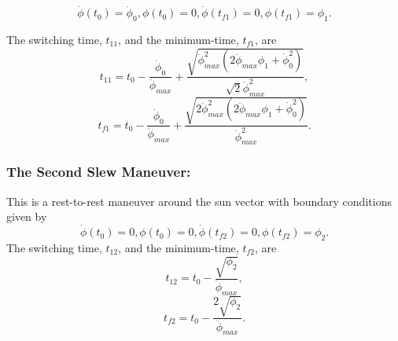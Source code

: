 \documentclass[journal ]{new-aiaa}
\begin{document}
	\begin{equation}\label{Bc1}
	\dot{\phi}(t_0)=\dot{\phi}_{0},\phi(t_0)=0, \dot{\phi}(t_{f1})=0,\phi(t_{f1})=\phi_1.
	\end{equation}
	
	The switching time, $t_{11}$, and the minimum-time, $t_{f1}$, are 
	\begin{equation}\label{t11}
	t_{11}=t_0-\frac{\dot{\phi}_0}{\ddot{\phi}_{max}}+\frac{\sqrt{\ddot{\phi}_{max}^2(2\ddot{\phi}_{max}\phi_1+\dot{\phi}_{0}^2)}}{\sqrt{2}\ddot{\phi}_{max}^2},
	\end{equation}
	\begin{equation}\label{tf1}
	t_{f1}=t_0-\frac{\dot{\phi}_0}{\ddot{\phi}_{max}}+\frac{\sqrt{2\ddot{\phi}_{max}^2(2\ddot{\phi}_{max}\phi_1+\dot{\phi}_{0}^2)}}{\ddot{\phi}_{max}^2}.
	\end{equation}

	
	
	\subsubsection{The Second Slew Maneuver:}
	This is a rest-to-rest maneuver around the sun vector with boundary conditions given by	
	\begin{equation}\label{Bc2}
	\dot{\phi}(t_0)=0, \phi(t_0)=0, \dot{\phi}(t_{f2})=0, \phi(t_{f2})=\phi_2.
	\end{equation}
	The switching time, $t_{12}$, and the minimum-time, $t_{f2}$, are
	\begin{equation}\label{t21}
	t_{12}=t_0-\frac{\sqrt{\phi_2}}{\ddot{\phi}_{max}},
	\end{equation}
	\begin{equation}\label{tf2}
	t_{f2}=t_0-\frac{2\sqrt{\phi_2}}{\ddot{\phi}_{max}}.
	\end{equation}

	
	
\end{document}
